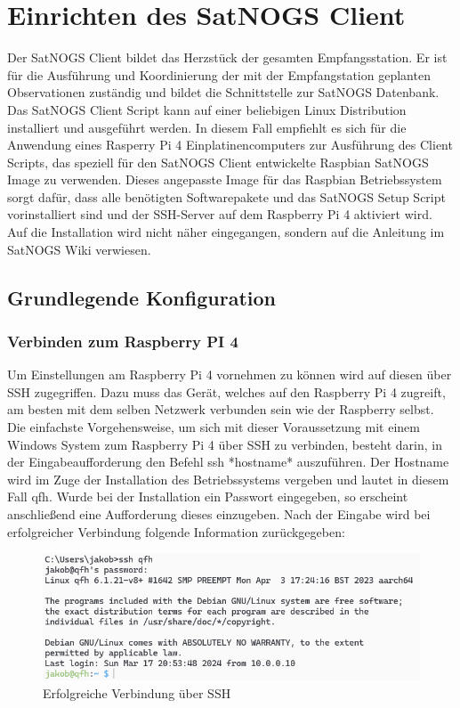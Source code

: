 \chapter{Einrichten des SatNOGS Client}
\label{chap:gs-setup}
Der SatNOGS Client bildet das Herzstück der gesamten Empfangsstation. Er ist für die Ausführung und Koordinierung der mit der Empfangstation geplanten Observationen zuständig und bildet die Schnittstelle zur SatNOGS Datenbank. Das SatNOGS Client Script kann auf einer beliebigen Linux Distribution installiert und ausgeführt werden. In diesem Fall empfiehlt es sich für die Anwendung eines Rasperry Pi 4 Einplatinencomputers zur Ausführung des Client Scripts, das speziell für den SatNOGS Client entwickelte Raspbian SatNOGS Image zu verwenden. Dieses angepasste Image für das Raspbian Betriebssystem sorgt dafür, dass alle benötigten Softwarepakete und das SatNOGS Setup Script vorinstalliert sind und der SSH-Server auf dem Raspberry Pi 4 aktiviert wird. Auf die Installation wird nicht näher eingegangen, sondern auf die Anleitung im SatNOGS Wiki \cite{noauthor_raspberry_nodate} verwiesen. 

\section{Grundlegende Konfiguration}
\subsection{Verbinden zum Raspberry PI 4}
Um Einstellungen am Raspberry Pi 4 vornehmen zu können wird auf diesen über SSH zugegriffen. Dazu muss das Gerät, welches auf den Raspberry Pi 4 zugreift, am besten mit dem selben Netzwerk verbunden sein wie der Raspberry selbst. Die einfachste Vorgehensweise, um sich mit dieser Voraussetzung mit einem Windows System zum Raspberry Pi 4 über SSH zu verbinden, besteht darin, in der Eingabeaufforderung den Befehl \glqq ssh *hostname*\grqq{} auszuführen. Der Hostname wird im Zuge der Installation des Betriebssystems vergeben und lautet in diesem Fall \glqq qfh\grqq{}. Wurde bei der Installation ein Passwort eingegeben, so erscheint anschließend eine Aufforderung dieses einzugeben. Nach der Eingabe wird bei erfolgreicher Verbindung folgende Information zurückgegeben:

\begin{figure} [H]
	\centering
	\includegraphics[width=\linewidth]{../ref/successfull_login.png}
	\caption{Erfolgreiche Verbindung über SSH}
	\label{fig:htrl-uhf(test)successfulllogin}
\end{figure}

